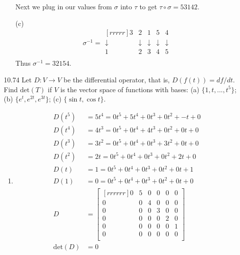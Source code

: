 \documentclass[12pt]{article}
\theoremstyle{definition}
\theoremstyle{plain}
\begin{document}
\begin{enumerate}
\begin{enumerate}
	Next we plug in our values from $\sigma$ into $\tau$ to get $\tau \circ \sigma = 53142$.
	\item[(c)] \[ \sigma^{-1}=\begin{matrix}[rrrrr]3&2&1&5&4\\\downarrow&\downarrow&\downarrow&\downarrow&\downarrow\\1&2&3&4&5\\\end{matrix} \]
	Thus $\sigma^{-1}=32154$.
	\end{enumerate}		
	
\item[10.74]Let $D: V\rightarrow V$ be the differential operator, that is, $D(f(t))=df/dt$. Find $\mathrm{det}(T)$ if $V$ is the vector space of functions with bases: (a) $\{1,t,...,t^5\}$; (b) $\{e^t,e^{2t},e^{3t}\}$; (c) $\{\sin t, \cos t\}$.
	\begin{enumerate}
	\item
	\begin{align*}
	D(t^5)&=5t^4=0t^5+5t^4+0t^3+0t^2+-t+0\\
	D(t^4)&=4t^3=0t^5+0t^4+4t^3+0t^2+0t+0\\
	D(t^3)&=3t^2=0t^5+0t^4+0t^3+3t^2+0t+0\\
	D(t^2)&=2t  =0t^5+0t^4+0t^3+0t^2+2t+0\\
	D(t)  &=1   =0t^5+0t^4+0t^3+0t^2+0t+1\\
	D(1)  &=0   =0t^5+0t^4+0t^3+0t^2+0t+0\\
	D&= \begin{bmatrix}[rrrrrr]0&5&0&0&0&0\\0&0&4&0&0&0\\0&0&0&3&0&0\\0&0&0&0&2&0\\0&0&0&0&0&1\\0&0&0&0&0&0\\\end{bmatrix}\\
	\mathrm{det}(D) &= 0
	\end{align*}
	

\end{enumerate}
\end{enumerate}
\end{document}
